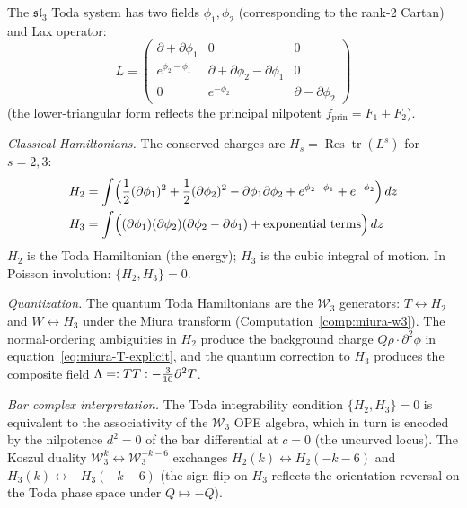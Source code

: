\begin{computation}
\label{comp:toda-sl3}

The $\mathfrak{sl}_3$ Toda system has two fields $\phi_1, \phi_2$
(corresponding to the rank-2 Cartan) and Lax operator:
\begin{equation}
L = \begin{pmatrix}
\partial + \partial\phi_1 & 0 & 0 \\
e^{\phi_2 - \phi_1} & \partial + \partial\phi_2 - \partial\phi_1 & 0 \\
0 & e^{-\phi_2} & \partial - \partial\phi_2
\end{pmatrix}
\end{equation}
(the lower-triangular form reflects the principal nilpotent
$f_{\mathrm{prin}} = F_1 + F_2$).

\emph{Classical Hamiltonians.}
The conserved charges are $H_s = \operatorname{Res} \operatorname{tr}(L^s)$
for $s = 2, 3$:
\begin{align}
H_2 &= \int \Bigl(\frac{1}{2}(\partial\phi_1)^2
+ \frac{1}{2}(\partial\phi_2)^2
- \partial\phi_1 \partial\phi_2
+ e^{\phi_2 - \phi_1} + e^{-\phi_2}\Bigr)\, dz \\
H_3 &= \int \Bigl((\partial\phi_1)(\partial\phi_2)(\partial\phi_2 - \partial\phi_1)
+ \text{exponential terms}\Bigr)\, dz
\end{align}
$H_2$ is the Toda Hamiltonian (the energy); $H_3$ is the cubic
integral of motion.  In Poisson involution: $\{H_2, H_3\} = 0$.

\emph{Quantization.}
The quantum Toda Hamiltonians are the $\mathcal{W}_3$ generators:
$T \leftrightarrow H_2$ and $W \leftrightarrow H_3$ under the Miura
transform (Computation~\ref{comp:miura-w3}).  The normal-ordering
ambiguities in $H_2$ produce the background charge
$Q \rho \cdot \partial^2\phi$ in equation~\eqref{eq:miura-T-explicit},
and the quantum correction to $H_3$ produces the composite field
$\Lambda = :{TT}: - \frac{3}{10}\partial^2 T$.

\emph{Bar complex interpretation.}
The Toda integrability condition $\{H_2, H_3\} = 0$ is equivalent
to the associativity of the $\mathcal{W}_3$ OPE algebra, which in turn
is encoded by the nilpotence $d^2 = 0$ of the bar differential at
$c = 0$ (the uncurved locus).  The Koszul duality
$\mathcal{W}_3^k \leftrightarrow \mathcal{W}_3^{-k-6}$ exchanges
$H_2(k) \leftrightarrow H_2(-k-6)$ and $H_3(k) \leftrightarrow -H_3(-k-6)$
(the sign flip on $H_3$ reflects the orientation reversal on the Toda
phase space under $Q \mapsto -Q$).
\end{computation}

